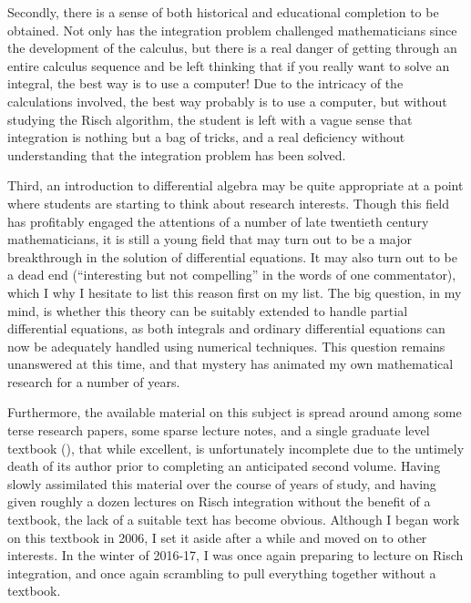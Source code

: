 Secondly, there is a sense of both historical and educational
completion to be obtained.  Not only has the integration problem
challenged mathematicians since the development of the calculus, but
there is a real danger of getting through an entire calculus sequence
and be left thinking that if you really want to solve an integral, the
best way is to use a computer!  Due to the intricacy of the
calculations involved, the best way probably is to use a computer, but
without studying the Risch algorithm, the student is left with a vague
sense that integration is nothing but a bag of tricks, and
a real deficiency without
understanding that the integration problem has been solved.

Third, an introduction to differential algebra may be quite
appropriate at a point where students are starting to think about
research interests.  Though this field has profitably engaged the
attentions of a number of late twentieth century mathematicians, it is
still a young field that may turn out to be a major breakthrough in
the solution of differential equations.  It may also turn out to be a
dead end (``interesting but not compelling'' in the words of one
commentator), which I why I hesitate to list this reason first on my
list.  The big question, in my mind, is whether this theory can be
suitably extended to handle partial differential equations, as both
integrals and ordinary differential equations can now be adequately
handled using numerical techniques.  This question remains unanswered
at this time, and that mystery has animated my own mathematical
research for a number of years.


Furthermore, the available material on this subject is spread around
among some terse research papers, some sparse lecture notes, and a
single graduate level textbook (\cite{bronstein book}), that while
excellent, is unfortunately incomplete due to the untimely death of
its author prior to completing an anticipated second volume.
Having
slowly assimilated this material over the course of years of study,
and having given roughly a dozen lectures on Risch integration
without the benefit of a textbook, the lack of a suitable text
has become obvious.  Although I began work on this textbook
in 2006, I set it aside after a while and moved on to other
interests.
In the winter of 2016-17, I was once again
preparing to lecture on Risch integration, and once again
scrambling to pull everything together without a textbook.

